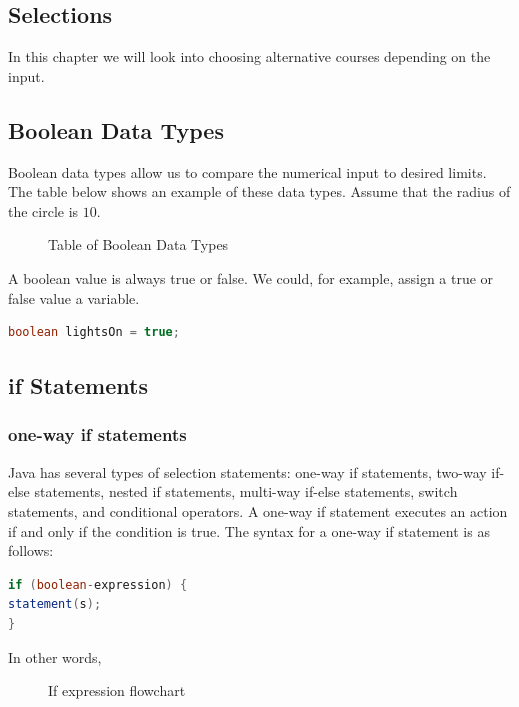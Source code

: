 \documentclass[11pt,a4 paper]{book}
\theoremstyle{plain}
\theoremstyle{definition}
\theoremstyle{remark}
\begin{document}
\begin{flushleft}
\chapter{Selections}
In this chapter we will look into choosing alternative courses depending on the input.
\section{Boolean Data Types}
Boolean data types allow us to compare the numerical input to desired limits. The table below shows an example of these data types. Assume that the radius of the circle is $10$.
\begin{figure}[H]
\centering
{}
\label{fig:booleandata}
\caption{Table of Boolean Data Types}
\end{figure} 
A boolean value is always true or false. We could, for example, assign a true or false value a variable. 
\begin{lstlisting}[language=Java]
boolean lightsOn = true;
\end{lstlisting}
\section{if Statements}
\subsection{one-way if statements}
Java has several types of selection statements: one-way if statements, two-way if-else
statements, nested if statements, multi-way if-else statements, switch statements, and 
conditional operators.
A one-way if statement executes an action if and only if the condition is true. The syntax 
for a one-way if statement is as follows:
\begin{lstlisting}[language=Java]
if (boolean-expression) {
statement(s);
}
\end{lstlisting}
In other words,
\begin{figure}[H]
\centering
{}
\label{fig:st}
\caption{If expression flowchart}


\end{figure}
\end{flushleft}
\end{document}
